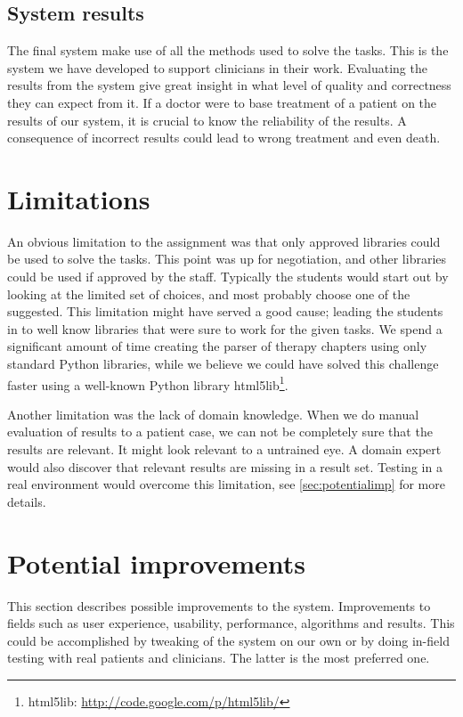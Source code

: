 \subsection{System results}
The final system make use of all the methods used to solve the tasks. This is the system we have developed to support clinicians in their work. Evaluating the results from the system give great insight in what level of quality and correctness they can expect from it. If a doctor were to base treatment of a patient on the results of our system, it is crucial to know the reliability of the results. A consequence of incorrect results could lead to wrong treatment and even death.


\section{Limitations}
An obvious limitation to the assignment was that only approved libraries could be used to solve the tasks. This point was up for negotiation, and other libraries could be used if approved by the staff. Typically the students would start out by looking at the limited set of choices, and most probably choose one of the suggested. This limitation might have served a good cause; leading the students in to well know libraries that were sure to work for the given tasks.
We spend a significant amount of time creating the parser of therapy chapters using only standard Python libraries, while we believe we could have solved this challenge faster using a well-known Python library
html5lib\footnote{html5lib: \url{http://code.google.com/p/html5lib/}}.

Another limitation was the lack of domain knowledge. When we do manual evaluation of results to a patient case, we can not be completely sure that the results are relevant. It might look relevant to a untrained eye. A domain expert would also discover that relevant results are missing in a result set. Testing in a real environment would overcome this limitation, see \autoref{sec:potentialimp} for more details.


\section{Potential improvements}
\label{sec:potentialimp}
This section describes possible improvements to the system. Improvements to fields such as user experience, usability, performance, algorithms and results. This could be accomplished by tweaking of the system on our own or by doing in-field testing with real patients and clinicians. The latter is the most preferred one.

